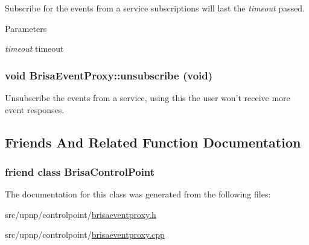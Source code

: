 Subscribe for the events from a service subscriptions will last the {\itshape timeout\/} passed. 
\begin{DoxyParams}{Parameters}
\item[{\em timeout}]timeout \end{DoxyParams}
\hypertarget{classBrisaUpnp_1_1BrisaEventProxy_ac106e076f6222480c676470cf51dc055}{
\subsubsection[{unsubscribe}]{\setlength{\rightskip}{0pt plus 5cm}void BrisaEventProxy::unsubscribe (void)}}
\label{classBrisaUpnp_1_1BrisaEventProxy_ac106e076f6222480c676470cf51dc055}


Unsubscribe the events from a service, using this the user won't receive more event responses. 

\subsection{Friends And Related Function Documentation}
\hypertarget{classBrisaUpnp_1_1BrisaEventProxy_aa8c1b769cde2c022772b925c1bee3d20}{
\subsubsection[{BrisaControlPoint}]{\setlength{\rightskip}{0pt plus 5cm}friend class {\bf BrisaControlPoint}}}
\label{classBrisaUpnp_1_1BrisaEventProxy_aa8c1b769cde2c022772b925c1bee3d20}


The documentation for this class was generated from the following files:\begin{DoxyCompactItemize}
\item 
src/upnp/controlpoint/\hyperlink{brisaeventproxy_8h}{brisaeventproxy.h}\item 
src/upnp/controlpoint/\hyperlink{brisaeventproxy_8cpp}{brisaeventproxy.cpp}\end{DoxyCompactItemize}
